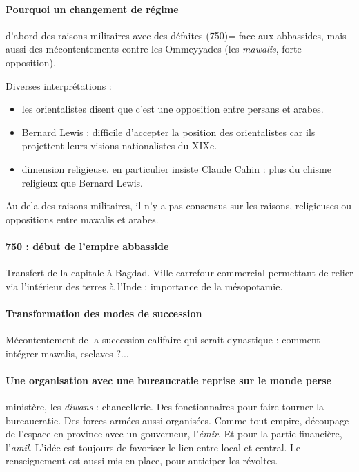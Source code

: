 \paragraph{Pourquoi un changement de régime} d'abord des raisons militaires avec des défaites (750)= face aux abbassides, mais aussi des mécontentements contre les Ommeyyades (les \textit{mawalis}, forte opposition). 

Diverses interprétations : 
\begin{itemize}
\item les orientalistes disent que c'est une opposition entre persans et arabes.
    \item Bernard Lewis : difficile d'accepter la position des orientalistes car ils projettent leurs visions nationalistes du XIXe.
    \item dimension religieuse. en particulier insiste Claude Cahin : plus du chisme religieux que Bernard Lewis. 
\end{itemize}

\begin{Synthesis}
Au dela des raisons militaires, il n'y a pas consensus sur les raisons, religieuses ou oppositions entre mawalis et arabes.
\end{Synthesis}

\paragraph{750 : début de l'empire abbasside} Transfert de la capitale à Bagdad. Ville carrefour commercial permettant de relier via l'intérieur des terres \Med à l'Inde : importance de la mésopotamie. 

\paragraph{Transformation des modes de succession} Mécontentement de la succession califaire qui serait dynastique : comment intégrer mawalis, esclaves ?...


\paragraph{Une organisation avec une bureaucratie reprise sur le monde perse} ministère, les \textit{diwans} : chancellerie. Des fonctionnaires pour faire tourner la bureaucratie. Des forces armées aussi organisées.  Comme tout empire, découpage de l'espace en province avec un gouverneur, l'\textit{émir}. Et pour la partie financière, l'\textit{amil}. L'idée est toujours de favoriser le lien entre local et central. Le renseignement est aussi mis en place, pour anticiper les révoltes. 

